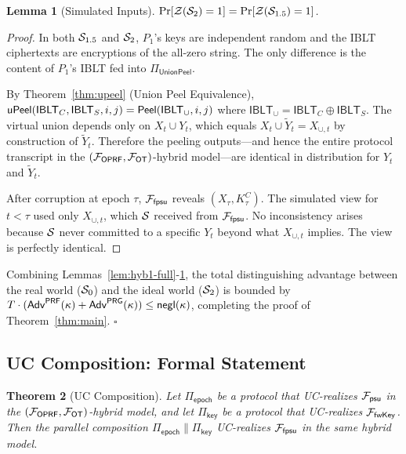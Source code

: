 \documentclass[letterpaper,twocolumn,10pt]{article}
\newtheorem{theorem}{Theorem}
\newtheorem{lemma}[theorem]{Lemma}
\theoremstyle{definition}
\begin{document}
\begin{lemma}[Simulated Inputs]\label{lem:hyb3-full}
$\Pr[\mathcal{Z}(\mathcal{S}_2)=1] = \Pr[\mathcal{Z}(\mathcal{S}_{1.5})=1]$.
\end{lemma}

\begin{proof}
In both $\mathcal{S}_{1.5}$ and $\mathcal{S}_2$, $P_1$'s keys are independent random and
the IBLT ciphertexts are encryptions of the all-zero string. The only
difference is the content of $P_1$'s IBLT fed into
$\Pi_{\mathsf{UnionPeel}}$.

By Theorem~\ref{thm:upeel} (Union Peel Equivalence),
$\mathsf{uPeel}(\mathsf{IBLT}_C, \mathsf{IBLT}_S, i, j) =
\mathsf{Peel}(\mathsf{IBLT}_\cup, i, j)$ where $\mathsf{IBLT}_\cup =
\mathsf{IBLT}_C \oplus \mathsf{IBLT}_S$. The virtual union depends only
on $X_t \cup Y_t$, which equals $X_t \cup \tilde{Y}_t = X_{\cup,t}$ by
construction of $\tilde{Y}_t$. Therefore the peeling outputs---and hence
the entire protocol transcript in the
$(\mathcal{F}_{\mathsf{OPRF}}, \mathcal{F}_{\mathsf{OT}})$-hybrid model---are identical
in distribution for $Y_t$ and $\tilde{Y}_t$.

After corruption at epoch $\tau$, $\mathcal{F}_{\mathsf{fpsu}}$ reveals
$(X_\tau, K^C_\tau)$. The simulated view for $t < \tau$ used only
$X_{\cup,t}$, which $\mathcal{S}$ received from $\mathcal{F}_{\mathsf{fpsu}}$. No
inconsistency arises because $\mathcal{S}$ never committed to a specific $Y_t$
beyond what $X_{\cup,t}$ implies. The view is perfectly identical.
\end{proof}

Combining Lemmas~\ref{lem:hyb1-full}-\ref{lem:hyb3-full}, the total
distinguishing advantage between the real world ($\mathcal{S}_0$) and the ideal
world ($\mathcal{S}_2$) is bounded by $T \cdot (\mathsf{Adv}^{\mathsf{PRF}}(\kappa)
+ \mathsf{Adv}^{\mathsf{PRG}}(\kappa)) \leq \mathsf{negl}(\kappa)$, completing the
proof of Theorem~\ref{thm:main}. \hfill$\square$

\subsection{UC Composition: Formal Statement}

\begin{theorem}[UC Composition]\label{thm:composition}
Let $\Pi_{\mathsf{epoch}}$ be a protocol that UC-realizes $\mathcal{F}_{\mathsf{psu}}$
in the $(\mathcal{F}_{\mathsf{OPRF}}, \mathcal{F}_{\mathsf{OT}})$-hybrid model, and let
$\Pi_{\mathsf{key}}$ be a protocol that UC-realizes $\mathcal{F}_{\mathsf{fwKey}}$.
Then the parallel composition $\Pi_{\mathsf{epoch}} \parallel
\Pi_{\mathsf{key}}$ UC-realizes $\mathcal{F}_{\mathsf{fpsu}}$ in the same hybrid
model.
\end{theorem}
\end{document}
